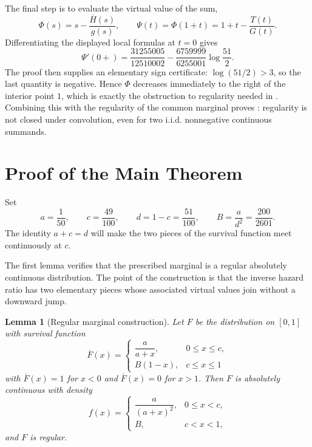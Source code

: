 \documentclass[11pt]{article}
\newtheorem{lemma}{Lemma}[section]
\begin{document}
The final step is to evaluate the virtual value of the sum,
\[
\Phi(s)=s-\frac{\overline H(s)}{g(s)}, \qquad
\Psi(t)=\Phi(1+t)=1+t-\frac{T(t)}{G(t)}.
\]
Differentiating the displayed local formulas at $t=0$ gives
\[
\Psi'(0+)
=
\frac{31255005}{12510002}
-\frac{6759999}{6255001}\log\frac{51}{2}.
\]
The proof then supplies an elementary sign certificate: $\log(51/2)>3$, so the
last quantity is negative.  Hence $\Phi$ decreases immediately to the right of
the interior point $1$, which is exactly the obstruction to regularity needed
in .  Combining this with the regularity of
the common marginal proves : regularity is not closed under
convolution, even for two i.i.d. nonnegative continuous summands.

\section{Proof of the Main Theorem}
\label{sec:main-proof}

Set
\[
a=\frac{1}{50},\qquad
c=\frac{49}{100},\qquad
d=1-c=\frac{51}{100},\qquad
B=\frac{a}{d^2}=\frac{200}{2601}.
\]
The identity $a+c=d$ will make the two pieces of the survival function meet
continuously at $c$.

The first lemma verifies that the prescribed marginal is a regular absolutely
continuous distribution.  The point of the construction is that the inverse hazard ratio
has two elementary pieces whose associated virtual values join without a
downward jump.

\begin{lemma}[Regular marginal construction]
\label{lem:marginal-regular}
Let $F$ be the distribution on $[0,1]$ with survival function
\begin{equation}
\label{eq:marginal-survival}
\overline F(x)=
\begin{cases}
\dfrac{a}{a+x}, & 0 \leq x \leq c,\\[6pt]
B(1-x), & c \leq x \leq 1
\end{cases}
\end{equation}
with $\overline F(x)=1$ for $x<0$ and $\overline F(x)=0$ for $x>1$.  Then
$F$ is absolutely continuous with density
\begin{equation}
\label{eq:marginal-density}
f(x)=
\begin{cases}
\dfrac{a}{(a+x)^2}, & 0 \leq x<c,\\[6pt]
B, & c<x<1,
\end{cases}
\end{equation}
and $F$ is regular.
\end{lemma}
\end{document}
